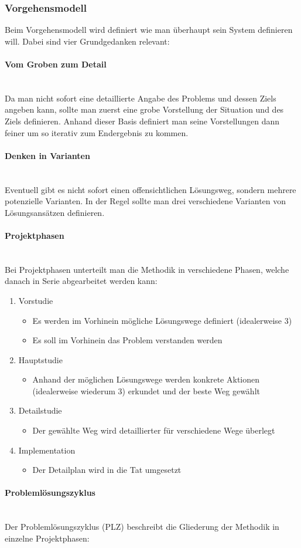 \documentclass{article}
\newcommand{\paragraphlb}[1]{\paragraph{#1}\mbox{}\\}
\begin{document}
	\subsubsection{Vorgehensmodell}
	Beim Vorgehensmodell wird definiert wie man überhaupt sein System definieren will. Dabei sind vier Grundgedanken relevant:
	\paragraphlb{Vom Groben zum Detail}
	Da man nicht sofort eine detaillierte Angabe des Problems und dessen Ziels angeben kann, sollte man zuerst eine grobe Vorstellung der Situation und des Ziels definieren. Anhand dieser Basis definiert man seine Vorstellungen dann feiner um so iterativ zum Endergebnis zu kommen.
	\paragraphlb{Denken in Varianten}
	Eventuell gibt es nicht sofort einen offensichtlichen Lösungsweg, sondern mehrere potenzielle Varianten. In der Regel sollte man drei verschiedene Varianten von Lösungsansätzen definieren.
	\paragraphlb{Projektphasen}
	Bei Projektphasen unterteilt man die Methodik in verschiedene Phasen, welche danach in Serie abgearbeitet werden kann:
	\begin{enumerate}
		\item{Vorstudie}
		\begin{itemize}
			\item{Es werden im Vorhinein mögliche Lösungswege definiert (idealerweise 3)}
			\item{Es soll im Vorhinein das Problem verstanden werden}
		\end{itemize}
		\item{Hauptstudie}
		\begin{itemize}
			\item{Anhand der möglichen Lösungswege werden konkrete Aktionen (idealerweise wiederum 3) erkundet und der beste Weg gewählt}
		\end{itemize}
		\item{Detailstudie}
		\begin{itemize}
			\item{Der gewählte Weg wird detaillierter für verschiedene Wege überlegt}
		\end{itemize}
		\item{Implementation}
		\begin{itemize}
			\item{Der Detailplan wird in die Tat umgesetzt}
		\end{itemize}
	\end{enumerate}
	\paragraphlb{Problemlösungszyklus}
	Der Problemlösungszyklus (PLZ) beschreibt die Gliederung der Methodik in einzelne Projektphasen:
\end{document}
